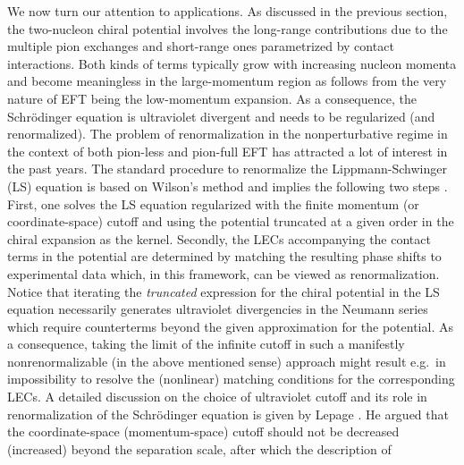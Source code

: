 \documentclass[aps,rmp,nofootinbib,twocolumn,floatfix]{revtex4}
\begin{document}
We now turn our attention to applications. As discussed in the previous
section, the two-nucleon chiral potential involves the long-range
contributions due to the multiple pion exchanges and short-range ones 
parametrized by contact interactions. Both kinds of terms typically grow with
increasing nucleon momenta and become meaningless in the large-momentum region
as follows from the very nature of EFT being the low-momentum expansion. 
As a consequence, the Schr\"odinger equation is ultraviolet divergent 
and needs to be regularized (and renormalized). The problem of renormalization
in the nonperturbative regime in the context of both pion-less 
\cite{Beane:1997pk,Phillips:1997xu,Birse:1998dk,
Phillips:1998uy,Gegelia:1998iu,Yang:2004ss,Harada:2006cw,Harada:2007ua,
Braaten:2004rn}
and pion-full EFT 
\cite{Lepage:1997,Cohen:1998bv,Frederico:1999ps,
Phillips:1999bf,Lepage:2000,Gegelia:2001ev,Beane:2001bc,PavonValderrama:2003np,
PavonValderrama:2004nb,Gegelia:2004pz,PavonValderrama:2005gu,Nogga:2005hy,
PavonValderrama:2005wv,PavonValderrama:2005uj,Birse:2005um,
Epelbaum:2006pt,Djukanovic:2006mc,Higa:2007gz,Yang:2007hb,
Long:2007vp,Entem:2007jg,Birse:2007sx,Valderrama:2008kj,Shukla:2008sp}
has attracted a lot of interest in the past years. 
The standard procedure to renormalize the Lippmann-Schwinger (LS) 
equation is based on Wilson's
method and implies the following two steps \cite{Lepage:1997}. First, 
one solves the LS equation regularized with the finite
momentum (or coordinate-space) cutoff and using the
potential truncated at a given order in the chiral expansion as the kernel.    
Secondly, the LECs accompanying the contact terms in the potential are 
determined by matching the resulting phase shifts to experimental data which,
in this framework, can be viewed as renormalization. Notice that iterating the
\emph{truncated} expression for the chiral potential in the LS equation
necessarily generates
ultraviolet divergencies in the Neumann series which require counterterms
beyond the given approximation for the potential. 
As a consequence, taking the limit of the infinite cutoff
in such a manifestly nonrenormalizable (in the above mentioned sense) approach
might result e.g.~in impossibility to resolve the (nonlinear) matching
conditions for the corresponding LECs. A detailed discussion on the 
choice of ultraviolet cutoff and its role in renormalization of the
Schr\"odinger equation is 
given by Lepage \cite{Lepage:1997,Lepage:2000}. He argued that the
coordinate-space (momentum-space) cutoff should not be decreased (increased)
beyond the separation scale, after which the description of  
\end{document}
